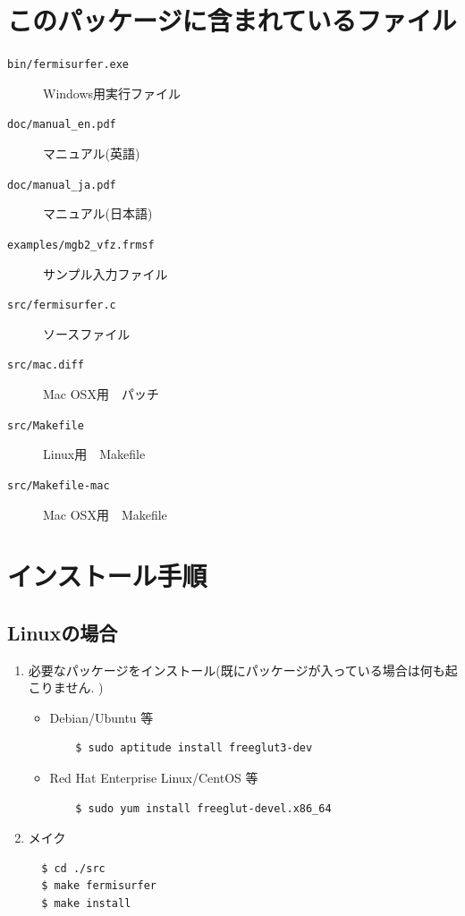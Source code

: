 \documentclass[12pt]{jarticle}
\begin{document}
\section{このパッケージに含まれているファイル}
\begin{description}
\item[\texttt{bin/fermisurfer.exe}] Windows用実行ファイル
\item[\texttt{doc/manual\_en.pdf}] マニュアル(英語)
\item[\texttt{doc/manual\_ja.pdf}] マニュアル(日本語)
\item[\texttt{examples/mgb2\_vfz.frmsf}] サンプル入力ファイル
\item[\texttt{src/fermisurfer.c}] ソースファイル
\item[\texttt{src/mac.diff}] Mac OSX用　パッチ
\item[\texttt{src/Makefile}] Linux用　Makefile
\item[\texttt{src/Makefile-mac}] Mac OSX用　Makefile
\end{description}

\section{インストール手順}

\subsection{Linuxの場合}

\begin{enumerate}

\item 必要なパッケージをインストール(既にパッケージが入っている場合は何も起こりません. )

  \begin{itemize}
  \item Debian/Ubuntu 等
    \begin{verbatim}
    $ sudo aptitude install freeglut3-dev
    \end{verbatim}
  \item Red Hat Enterprise Linux/CentOS 等
    \begin{verbatim}
    $ sudo yum install freeglut-devel.x86_64
    \end{verbatim}
  \end{itemize}

\item メイク

\begin{verbatim}
  $ cd ./src
  $ make fermisurfer
  $ make install
\end{verbatim}

\end{enumerate}
\end{document}
